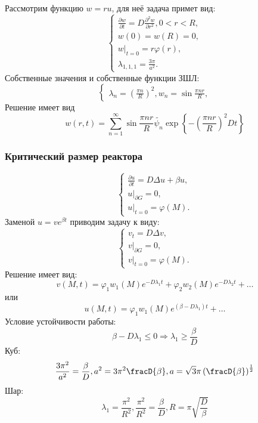 \documentclass[11pt]{article}
\begin{document}
Рассмотрим функцию $w = ru$, для неё задача примет вид:
\begin{equation}
\begin{cases}
\frac{\partial w}{\partial t} = D\frac{\partial^2 w}{\partial r^2}, 0 < r < R, \\
w(0) = w(R) = 0, \\
w|_{t = 0} = r\varphi(r) , \\
\lambda_{1, 1, 1} = \frac{3\pi}{a^2}.
\end{cases}
\end{equation}
Собственные значения и собственные функции ЗШЛ:
\begin{equation}
\begin{cases}
\lambda_n = \left(\frac{\pi n}R\right)^2, w_n = \sin\frac{\pi nr}R,
\end{cases}
\end{equation}
Решение имеет вид
\begin{equation}
w(r, t) = \sum_{n = 1}^{\infty}\sin\frac{\pi nr}R\tilde{\psi_n}\exp\left\{-\left(\frac{\pi nr}R\right)^2Dt\right\}
\end{equation}
\subsubsection{Критический размер реактора}
\label{sec:org21303bd}
\begin{equation}
\begin{cases}
\frac{\partial u}{\partial t} = D\Delta u + \beta u, \\
u|_{\partial G} = 0, \\
u|_{t = 0} = \varphi(M).
\end{cases}
\end{equation}
Заменой $u = ve^{\beta t}$ приводим задачу к виду:
\begin{equation}
\begin{cases}
v_t = D\Delta v, \\
v|_{\partial G} = 0, \\
v|_{t = 0} = \varphi(M).
\end{cases}
\end{equation}
Решение имеет вид:
\begin{equation}
v(M, t) = \varphi_1w_1(M)e^{-D\lambda_1t} + \varphi_2w_2(M)e^{-D\lambda_2t} + \ldots
\end{equation}
или
\begin{equation}
u(M, t) = \varphi_1w_1(M)e^{(\beta - D\lambda_1)t} + \ldots
\end{equation}
Условие устойчивости работы:
\begin{equation}
\beta - D\lambda_1 \leq 0 \Rightarrow \lambda_1 \geq \frac{\beta}D
\end{equation}
Куб:
\begin{equation}
\frac{3\pi^2}{a^2} = \frac{\beta}D, a^2 = 3\pi^2\fracD{\beta}, a = \sqrt{3}\pi\left(\fracD{\beta}\right)^\frac12
\end{equation}
Шар:
\begin{equation}
\lambda_1 = \frac{\pi^2}{R^2}, \frac{\pi^2}{R^2} = \frac{\beta}D, R = \pi\sqrt{\frac{D}{\beta}}
\end{equation}
\end{document}
